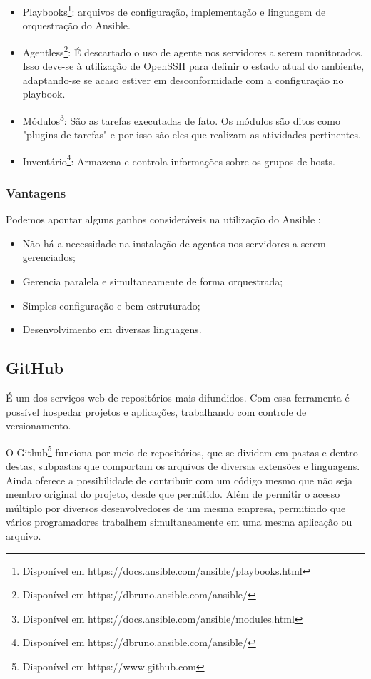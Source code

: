 \begin{itemize}
	\item Playbooks\footnote{Disponível em https://docs.ansible.com/ansible/playbooks.html}: arquivos de configuração, implementação e linguagem de orquestração do Ansible.
	\item Agentless\footnote{Disponível em https://dbruno.ansible.com/ansible/}: É descartado o uso de agente nos servidores a serem monitorados. Isso deve-se à utilização de OpenSSH para definir o estado atual do ambiente, adaptando-se se acaso estiver em desconformidade com a configuração no playbook.
	\item Módulos\footnote{Disponível em https://docs.ansible.com/ansible/modules.html}: São as tarefas executadas de fato. Os módulos são ditos como "plugins de tarefas" e por isso são eles que realizam as atividades pertinentes.
	\item Inventário\footnote{Disponível em https://dbruno.ansible.com/ansible/}: Armazena e controla informações sobre os grupos de hosts.
\end{itemize}

\subsubsection{Vantagens}
Podemos apontar alguns ganhos consideráveis na utilização do Ansible \cite{juniordevops} :
\begin{itemize}
	\item Não há a necessidade na instalação de agentes nos servidores a serem gerenciados;
	\item Gerencia paralela e simultaneamente de forma orquestrada; 
	\item Simples configuração e bem estruturado;
	\item Desenvolvimento em diversas linguagens.
\end{itemize}

\subsection{GitHub }
É um dos serviços web de repositórios mais difundidos. Com essa ferramenta é possível hospedar projetos e aplicações, trabalhando com controle de versionamento.

O Github\footnote{Disponível em https://www.github.com} funciona por meio de repositórios, que se dividem em pastas e dentro destas, subpastas que comportam os arquivos de diversas extensões e linguagens. Ainda oferece a possibilidade de contribuir com um código mesmo que não seja membro original do projeto, desde que permitido. Além de permitir o acesso múltiplo por diversos desenvolvedores de um mesma empresa, permitindo que vários programadores trabalhem simultaneamente em uma mesma aplicação ou arquivo.

